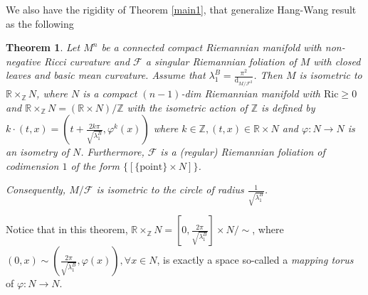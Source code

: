\documentclass[11pt]{amsart}
\newtheorem{theorem}{Theorem}[section]
\def\d{\mathrm{d}}
\def\ric{\mathrm{Ric}}
\begin{document}
We also have the rigidity of Theorem \ref{main1}, that generalize Hang-Wang result as the following
\begin{theorem}\label{main2}
    Let $M^n$ be a connected compact Riemannian manifold with non-negative Ricci curvature and $\mathcal{F}$ a singular Riemannian foliation of $M$ with closed leaves and basic mean curvature. Assume that $\lambda_1^B=\frac{\pi^2}{\d_{M/\mathcal{F}^2}}$. Then $M$ is isometric to $\mathbb{R}\times_\mathbb{Z}N$, where $N$ is a compact $(n-1)$-dim Riemannian manifold with $\ric\geq 0$ and $\mathbb{R}\times_\mathbb{Z}N=(\mathbb{R}\times N)/\mathbb{Z}$ with the isometric action of $\mathbb{Z}$ is defined by $k\cdot (t,x)=\left(t+\frac{2k\pi}{\sqrt{\lambda_1^B}},\varphi^k(x)\right)$ where $k\in \mathbb{Z},(t,x)\in \mathbb{R}\times N$ and $\varphi:N\to N$ is an isometry of $N$. Furthermore, $\mathcal{F}$ is a (regular) Riemannian foliation of codimension $1$ of the form $\{[\{\text{point}\}\times N]\}$.

    Consequently, $M/\mathcal{F}$ is isometric to the circle of radius $\frac{1}{\sqrt{\lambda_1^B}}$.
\end{theorem}

Notice that in this theorem,  $\mathbb{R}\times_\mathbb{Z}N=\left[0,\frac{2\pi}{\sqrt{\lambda_1^B}}\right]\times N/\sim$, where  $(0,x)\sim\left(\frac{2\pi}{\sqrt{\lambda_1^B}},\varphi(x)\right),\forall x\in N$, is exactly a space so-called a \textit{mapping torus} of $\varphi:N\to N$.
\end{document}
